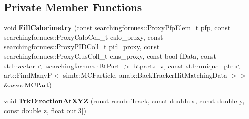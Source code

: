 \subsection*{Private Member Functions}
\begin{DoxyCompactItemize}
\item 
void {\bfseries Fill\+Calorimetry} (const searchingfornues\+::\+Proxy\+Pfp\+Elem\+\_\+t pfp, const searchingfornues\+::\+Proxy\+Calo\+Coll\+\_\+t calo\+\_\+proxy, const searchingfornues\+::\+Proxy\+P\+I\+D\+Coll\+\_\+t pid\+\_\+proxy, const searchingfornues\+::\+Proxy\+Clus\+Coll\+\_\+t clus\+\_\+proxy, const bool f\+Data, const std\+::vector$<$ \hyperlink{structsearchingfornues_1_1BtPart}{searchingfornues\+::\+Bt\+Part} $>$ btparts\+\_\+v, const std\+::unique\+\_\+ptr$<$ art\+::\+Find\+ManyP$<$ simb\+::\+M\+C\+Particle, anab\+::\+Back\+Tracker\+Hit\+Matching\+Data $>$$>$ \&assoc\+M\+C\+Part)\hypertarget{classanalysis_1_1CalorimetryAnalysis_ace6489df3503462c25bea5ae3837abae}{}\label{classanalysis_1_1CalorimetryAnalysis_ace6489df3503462c25bea5ae3837abae}

\item 
void {\bfseries Trk\+Direction\+At\+X\+YZ} (const recob\+::\+Track, const double x, const double y, const double z, float out\mbox{[}3\mbox{]})\hypertarget{classanalysis_1_1CalorimetryAnalysis_a9dda46fef9265f005050b3df5a5702c6}{}\label{classanalysis_1_1CalorimetryAnalysis_a9dda46fef9265f005050b3df5a5702c6}

\end{DoxyCompactItemize}
